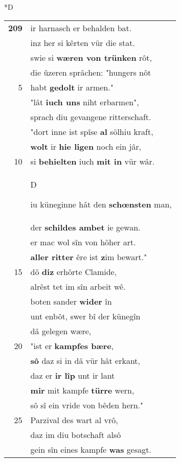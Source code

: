 \documentclass[8pt,a4paper,notitlepage]{article}
\begin{document}
\begin{table}[ht]
\begin{minipage}[t]{0.5\linewidth}
\small
\begin{center}*D
\end{center}
\begin{tabular}{rl}
\textbf{209} & ir harnasch er behalden bat.\\ 
 & inz her si kêrten vür die stat.\\ 
 & swie si \textbf{wæren von trünken} rôt,\\ 
 & die ûzeren sprâchen: "hungers nôt\\ 
5 & habt \textbf{gedolt} ir armen."\\ 
 & "lât \textbf{iuch uns} niht erbarmen",\\ 
 & sprach diu gevangene ritterschaft.\\ 
 & "dort inne ist spîse \textbf{al} sölhiu kraft,\\ 
 & \textbf{wolt} ir \textbf{hie ligen} noch ein jâr,\\ 
10 & si \textbf{behielten} iuch \textbf{mit in} vür wâr.\\ 
 & \begin{large}D\end{large}iu küneginne hât den \textbf{schœnsten} man,\\ 
 & der \textbf{schildes ambet} ie gewan.\\ 
 & er mac wol sîn von hôher art.\\ 
 & \textbf{aller ritter} êre ist \textbf{z}im bewart."\\ 
15 & dô \textbf{diz} erhôrte Clamide,\\ 
 & alrêst tet im sîn arbeit wê.\\ 
 & boten sander \textbf{wider} în\\ 
 & unt enbôt, swer bî der künegîn\\ 
 & dâ gelegen wære,\\ 
20 & "ist er \textbf{kampfes bære},\\ 
 & \textbf{sô} daz si in dâ vür hât erkant,\\ 
 & daz er \textbf{ir lîp} unt ir lant\\ 
 & \textbf{mir} mit kampfe \textbf{türre} wern,\\ 
 & sô sî ein vride von bêden hern."\\ 
25 & Parzival des wart al vrô,\\ 
 & daz im diu botschaft alsô\\ 
 & gein sîn eines kampfe \textbf{was} gesagt.\\ 

\end{tabular}
\end{minipage}
\end{table}
\end{document}
